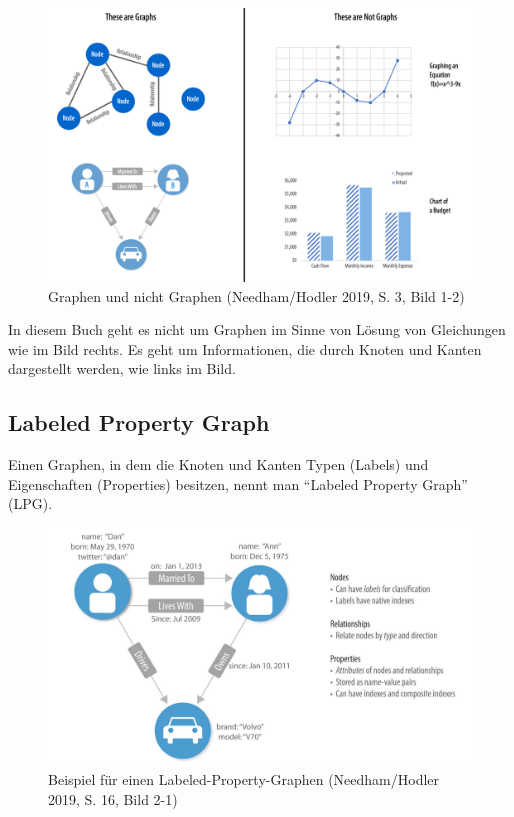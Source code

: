 \documentclass[ngerman,]{scrreprt}
\begin{document}
\begin{figure}
\centering
\includegraphics{Bilder/Graph-Algorithms/02-1-2-GraphsNotGraphs.png}
\caption{Graphen und nicht Graphen (Needham/Hodler 2019, S. 3, Bild 1-2)}
\end{figure}

In diesem Buch geht es nicht um Graphen im Sinne von Lösung von Gleichungen wie im Bild rechts. Es geht um Informationen, die durch Knoten und Kanten dargestellt werden, wie links im Bild.

\hypertarget{labeled-property-graph}{%
\subsection{Labeled Property Graph}\label{labeled-property-graph}}

Einen Graphen, in dem die Knoten und Kanten Typen (Labels) und Eigenschaften (Properties) besitzen, nennt man ``Labeled Property Graph'' (LPG).

\begin{figure}
\centering
\includegraphics{Bilder/Graph-Algorithms/16-2-1-LabeledPropertyGraph.png}
\caption{Beispiel für einen Labeled-Property-Graphen (Needham/Hodler 2019, S. 16, Bild 2-1)}
\end{figure}
\end{document}
